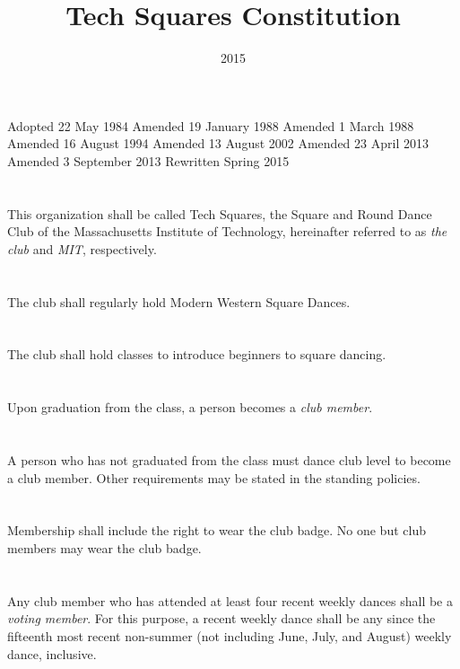 \documentclass{bylaws}
\title{Tech Squares Constitution}
\date{2015}
\begin{document}
\maketitle

\begin{history}
Adopted 22 May 1984
Amended 19 January 1988
Amended 1 March 1988
Amended 16 August 1994
Amended 13 August 2002
Amended 23 April 2013
Amended 3 September 2013
Rewritten Spring 2015
\end{history}


\section{}This organization shall be called Tech Squares, the Square and Round Dance Club of the Massachusetts Institute of Technology, hereinafter referred to as \textit{the club} and \textit{MIT}, respectively.
\section{}The club shall regularly hold Modern Western Square Dances.
\section{}The club shall hold classes to introduce beginners to square dancing.


\section{}Upon graduation from the class, a person becomes a \textit{club member}.
\section{}A person who has not graduated from the class must dance club level to become a club member. Other requirements may be stated in the standing policies.
\section{}Membership shall include the right to wear the club badge. No one but club members may wear the club badge.
\section{}Any club member who has attended at least four recent weekly dances shall be a \textit{voting member}. For this purpose, a recent weekly dance shall be any since the fifteenth most recent non-summer (not including June, July, and August) weekly dance, inclusive.
\end{document}
